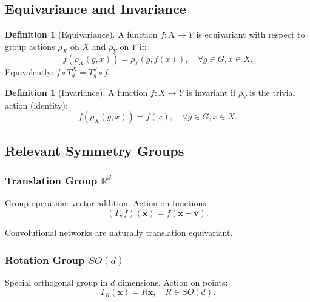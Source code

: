 \documentclass[12pt]{report}
\theoremstyle{definition}
\newtheorem{definition}[theorem]{Definition}
\newcommand{\R}{\mathbb{R}}
\begin{document}
\subsection{Equivariance and Invariance}

\begin{definition}[Equivariance]
A function $f: X \to Y$ is equivariant with respect to group actions $\rho_X$ on $X$ and $\rho_Y$ on $Y$ if:
\begin{equation}
f(\rho_X(g, x)) = \rho_Y(g, f(x)), \quad \forall g \in G, x \in X.
\label{eq:equivariance}
\end{equation}
Equivalently: $f \circ T_g^X = T_g^Y \circ f$.
\end{definition}

\begin{definition}[Invariance]
A function $f: X \to Y$ is invariant if $\rho_Y$ is the trivial action (identity):
\begin{equation}
f(\rho_X(g, x)) = f(x), \quad \forall g \in G, x \in X.
\label{eq:invariance}
\end{equation}
\end{definition}

\subsection{Relevant Symmetry Groups}

\subsubsection{Translation Group $\R^d$}

Group operation: vector addition. Action on functions:
\begin{equation}
(T_{\mathbf{v}} f)(\mathbf{x}) = f(\mathbf{x} - \mathbf{v}).
\label{eq:translation_action}
\end{equation}

Convolutional networks are naturally translation equivariant.

\subsubsection{Rotation Group $SO(d)$}

Special orthogonal group in $d$ dimensions. Action on points:
\begin{equation}
T_R(\mathbf{x}) = R\mathbf{x}, \quad R \in SO(d).
\label{eq:rotation_action}
\end{equation}
\end{document}
